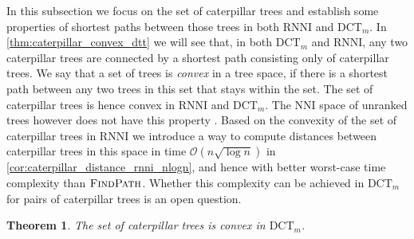 \documentclass[11pt]{amsart}
\newtheorem{theorem}{Theorem}
\newcommand{\rnni}{\mathrm{RNNI}}
\newcommand{\findpath}{\textsc{FindPath}}
\newcommand{\nni}{\mathrm{NNI}}
\newcommand{\dct}{\mathrm{DCT}}
\renewcommand{\O}{\mathcal O}
\newcommand{\summary}[1]{} %
\begin{document}
\summary{Defining Caterpillar trees. Why are they interesting?}
In this subsection we focus on the set of caterpillar trees and establish some properties of shortest paths between those trees in both $\rnni$ and $\dct_m$.
In \autoref{thm:caterpillar_convex_dtt} we will see that, in both $\dct_m$ and $\rnni$, any two caterpillar trees are connected by a shortest path consisting only of caterpillar trees.
We say that a set of trees is \emph{convex} in a tree space, if there is a shortest path between any two trees in this set that stays within the set.
The set of caterpillar trees is hence convex in $\rnni$ and $\dct_m$.
The $\nni$ space of unranked trees however does not have this property \autocite{Gavryushkin2018-ol}.
Based on the convexity of the set of caterpillar trees in $\rnni$ we introduce a way to compute distances between caterpillar trees in this space in time $\O(n \sqrt{\log n})$ in \autoref{cor:caterpillar_distance_rnni_nlogn}, and hence with better worst-case time complexity than $\findpath$.
Whether this complexity can be achieved in $\dct_m$ for pairs of caterpillar trees is an open question.

\begin{theorem}
	The set of caterpillar trees is convex in $\dct_m$.
	\label{thm:caterpillar_convex_dtt}
\end{theorem}
\end{document}
